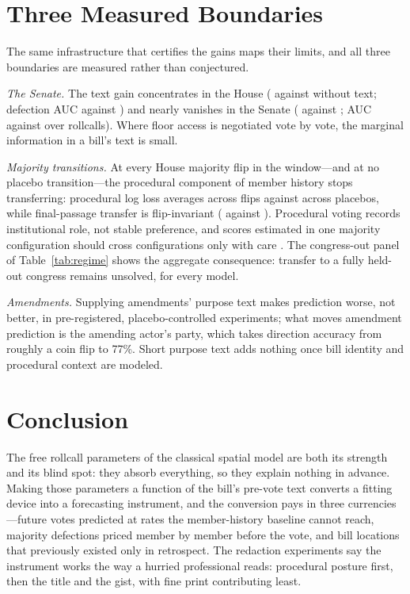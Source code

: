 \documentclass[12pt]{article}
\begin{document}
\section{Three Measured Boundaries}
\label{sec:limits}

The same infrastructure that certifies the gains maps their limits, and
all three boundaries are measured rather than conjectured.

\emph{The Senate.} The text gain concentrates in the House
(\houseLLchamp{} against \houseLLnotext{} without text; defection AUC
\protAUCtextHouse{} against \protAUCnotextHouse) and nearly vanishes in
the Senate (\senateLLchamp{} against \senateLLnotext; AUC
\protAUCtextSenate{} against \protAUCnotextSenate{} over
\protRCsenate{} rollcalls). Where floor access is negotiated vote by
vote, the marginal information in a bill's text is small.

\emph{Majority transitions.} At every House majority flip in the
window---and at no placebo transition---the procedural component of
member history stops transferring: procedural log loss averages
\flipProcLL{} across flips against \placeboProcLL{} across placebos,
while final-passage transfer is flip-invariant (\flipPassLL{} against
\placeboPassLL). Procedural voting records institutional role, not
stable preference, and scores estimated in one majority configuration
should cross configurations only with care \citep{bateman2017house}.
The congress-out panel of Table~\ref{tab:regime} shows the aggregate
consequence: transfer to a fully held-out congress remains unsolved,
for every model.

\emph{Amendments.} Supplying amendments' purpose text makes prediction
worse, not better, in pre-registered, placebo-controlled experiments;
what moves amendment prediction is the amending actor's party, which
takes direction accuracy from roughly a coin flip to 77\%. Short
purpose text adds nothing once bill identity and procedural context are
modeled.

\section{Conclusion}
\label{sec:conclusion}

The free rollcall parameters of the classical spatial model are both
its strength and its blind spot: they absorb everything, so they
explain nothing in advance. Making those parameters a function of the
bill's pre-vote text converts a fitting device into a forecasting
instrument, and the conversion pays in three currencies---future votes
predicted at rates the member-history baseline cannot reach, majority
defections priced member by member before the vote, and bill locations
that previously existed only in retrospect. The redaction experiments
say the instrument works the way a hurried professional reads:
procedural posture first, then the title and the gist, with fine print
contributing least.
\end{document}
